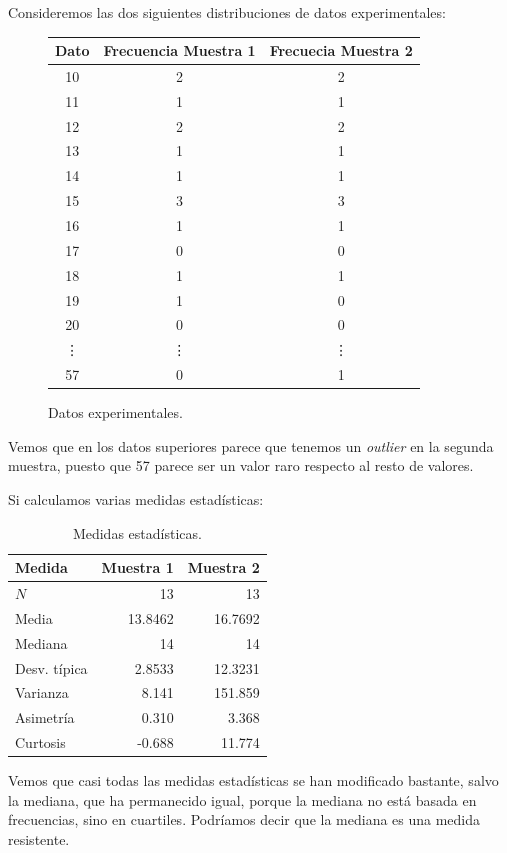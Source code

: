 \begin{ejemplo}
    Consideremos las dos siguientes distribuciones de datos experimentales:
    \begin{figure}[H]
        \centering
    \begin{tabular}{c|cc}
        Dato & Frecuencia Muestra 1 & Frecuecia Muestra 2 \\
        \hline
        10 & 2 & 2 \\
        11 & 1 & 1 \\
        12 & 2 & 2 \\
        13 & 1 & 1 \\
        14 & 1 & 1 \\
        15 & 3 & 3 \\
        16 & 1 & 1 \\
        17 & 0 & 0 \\
        18 & 1 & 1 \\
        19 & 1 & 0 \\
        20 & 0 & 0 \\
        \vdots & \vdots & \vdots \\
        57 & 0 & 1 
    \end{tabular}
    \caption{Datos experimentales.}
    \end{figure}

    \noindent
    Vemos que en los datos superiores parece que tenemos un \textit{outlier} en la segunda muestra, puesto que 57 parece ser un valor raro respecto al resto de valores.

    \noindent
    Si calculamos varias medidas estadísticas:
    \begin{table}[H]
    \centering
    \begin{tabular}{l|rr}
        Medida & Muestra 1 & Muestra 2 \\
        \hline
        $N$ & 13 & 13 \\
        Media & 13.8462 & 16.7692 \\
        Mediana & 14 & 14 \\
        Desv. típica & 2.8533 & 12.3231 \\
        Varianza & 8.141 & 151.859 \\
        Asimetría & 0.310 & 3.368 \\
        Curtosis & -0.688 & 11.774
    \end{tabular}
    \caption{Medidas estadísticas.}
    \end{table}

    \noindent
    Vemos que casi todas las medidas estadísticas se han modificado bastante, salvo la mediana, que ha permanecido igual, porque la mediana no está basada en frecuencias, sino en cuartiles. Podríamos decir que la mediana es una medida resistente.
\end{ejemplo}

